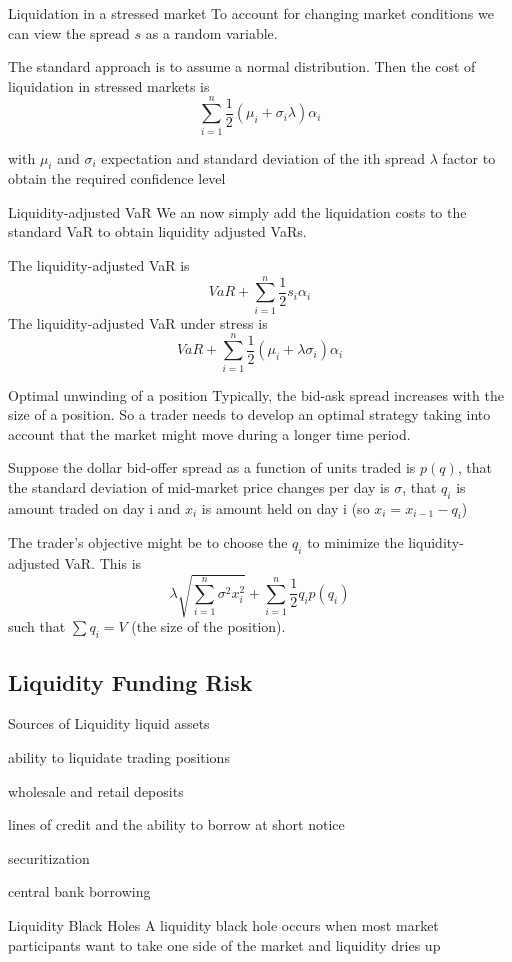 Liquidation in a stressed market
	To account for changing market conditions we can view the spread $s$ as a random variable.
	
	The standard approach is to assume a normal distribution. Then the 
	cost of liquidation in stressed markets is
		$$
		\sum _{i=1}^{n} \frac{1}{2} (\mu_i+\sigma_i \lambda) \alpha_i
		$$
	
	with
		$\mu_i$ and $\sigma_i$ expectation and standard deviation of the ith spread
		$\lambda$ factor to obtain the required confidence level


Liquidity-adjusted VaR
	We an now simply add the liquidation costs to the standard VaR to obtain liquidity adjusted VaRs.
	
	The liquidity-adjusted VaR is
		$$
		VaR+ \sum _{i=1}^{n} \frac{1}{2} s_i \alpha_i
		$$
	The liquidity-adjusted VaR under stress is
		$$
		VaR+ \sum _{i=1}^{n} \frac{1}{2}  (\mu_i + \lambda \sigma_i) \alpha_i
		$$


Optimal unwinding of a position
	Typically, the bid-ask spread increases with the size of a position. So a trader needs to 
	develop an optimal strategy taking into account that the market might move during a longer time period. 
	
	Suppose the dollar bid-offer spread as a function of units traded is $p(q)$, that the standard 
	deviation of mid-market price changes per day is $\sigma$, that $q_i$ is amount traded 
	on day i and $x_i$ is amount held on day i (so $x_i = x_{i-1}-q_i$)
	
	The trader's objective might be to choose the $q_i$ to minimize the liquidity-adjusted VaR. This is
		$$
		\lambda \sqrt{\sum_{i=1}^n \sigma^2x_i^2} + \sum _{i=1}^{n} \frac{1}{2} q_i p(q_i)
		$$
	such that  $\sum q_i =V$ (the size of the position).


\subsection{Liquidity Funding Risk}

Sources of Liquidity
	liquid assets
	
	ability to liquidate trading positions
	
	wholesale and retail deposits
	
	lines of credit and the ability to borrow at short notice
	
	securitization
	
	central bank borrowing


Liquidity Black Holes
	A liquidity black hole occurs when most market participants want to take one side of the market and liquidity dries up
	

